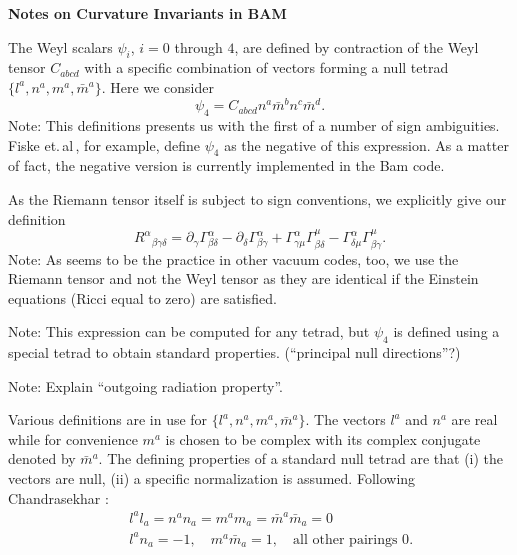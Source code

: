 \documentclass[12pt]{article}
\newcommand{\mysec}[1]{\bigskip\noindent{\bf #1}\smallskip}
\begin{document}
\begin{center}
{\large\bf Notes on Curvature Invariants in BAM}
\end{center}
\bigskip
\bigskip
\bigskip



\mysec{Definition of $\psi_4$}

The Weyl scalars $\psi_i$, $i = 0$ through $4$, are defined by
contraction of the Weyl tensor $C_{abcd}$ with a specific combination
of vectors forming a null tetrad $\{l^a,n^a,m^a,\bar{m}^a\}$. Here we
consider
%
\begin{equation}
        \psi_4 = C_{abcd} n^a \bar{m}^b n^c \bar{m}^d .
\end{equation}
%
Note: This definitions presents us with the first of a number of
sign ambiguities. Fiske et.\,al\,\cite{Fiske2005},
for example, define $\psi_4$ as the negative of this expression.
As a matter of fact, the negative version is currently implemented
in the {\sc Bam} code.

As the Riemann tensor itself is subject to sign conventions, we
explicitly give our definition
%
\begin{equation}
  R^\alpha{}_{\beta \gamma \delta} = \partial_\gamma
        \Gamma^\alpha_{\beta \delta} - \partial_{\delta}
        \Gamma^\alpha_{\beta \gamma} + \Gamma^\alpha_{\gamma \mu}
        \Gamma^{\mu}_{\beta \delta} - \Gamma^\alpha_{\delta \mu}
        \Gamma^\mu_{\beta \gamma}.
\end{equation}
%
Note: As seems to be the practice in other vacuum codes, too, we
use the Riemann tensor and not the Weyl tensor as they are identical
if the Einstein equations (Ricci equal to zero) are satisfied.  

Note: This expression can be computed for any tetrad, but $\psi_4$ is
defined using a special tetrad to obtain standard
properties. (``principal null directions''?)

Note: Explain ``outgoing radiation property''.



\mysec{The tetrad}

Various definitions are in use for $\{l^a,n^a,m^a,\bar{m}^a\}$. The
vectors $l^a$ and $n^a$ are real while for convenience $m^a$ is chosen
to be complex with its complex conjugate denoted by $\bar{m}^a$. The
defining properties of a standard null tetrad are that (i) the vectors
are null, (ii) a specific normalization is assumed. Following
Chandrasekhar \cite{Chandrasekhar1983}:
%
\begin{eqnarray}
        && l^a l_a = n^a n_a = m^a m_a = \bar{m}^a\bar{m}_a = 0 \\
        && l^a n_a =-1,\quad m^a \bar{m}_a = 1,
        \quad \mbox{all other pairings 0} .
\end{eqnarray}
%
\end{document}
